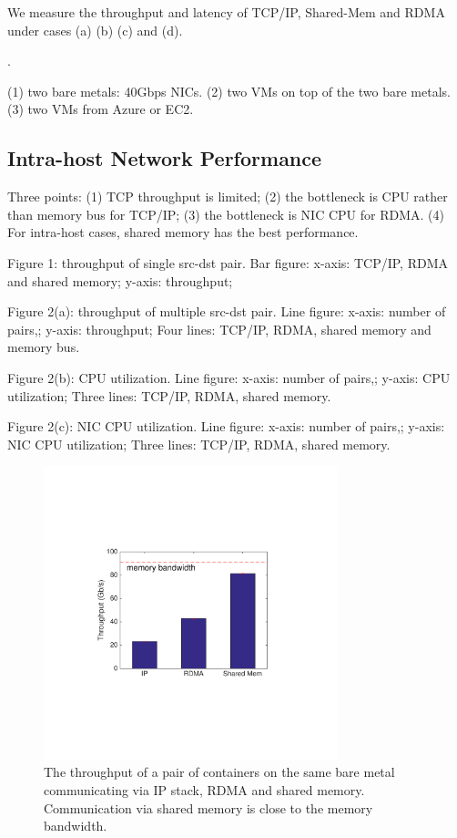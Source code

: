 We measure the throughput and latency of TCP/IP, Shared-Mem and RDMA under cases
(a) (b) (c) and (d).

.


(1) two bare metals: 40Gbps NICs.
(2) two VMs on top of the two bare metals.
(3) two VMs from Azure or EC2.

\subsection{Intra-host Network Performance}


Three points: (1) TCP throughput is limited; (2) the bottleneck is CPU rather than memory bus for TCP/IP; (3) the bottleneck is NIC CPU for RDMA. (4) For intra-host cases, shared memory has the best performance.

Figure 1: throughput of single src-dst pair. Bar figure: x-axis: TCP/IP, RDMA and shared memory; y-axis: throughput;

Figure 2(a): throughput of multiple src-dst pair. Line figure: x-axis: number of pairs,; y-axis: throughput; Four lines: TCP/IP, RDMA, shared memory and memory bus.

Figure 2(b): CPU utilization. Line figure: x-axis: number of pairs,; y-axis: CPU utilization; Three lines: TCP/IP, RDMA, shared memory.

Figure 2(c): NIC CPU utilization. Line figure: x-axis: number of pairs,; y-axis: NIC CPU utilization; Three lines: TCP/IP, RDMA, shared memory.

\begin{figure}[!ht]
     \centering 
     \includegraphics[width=3.35in]{figures/motivation/eval_baremetal_thr.pdf} 
     \caption{\label{fig:eval_baremetal_thr} The throughput of a pair of containers on the same bare metal communicating via IP stack, RDMA and shared memory. Communication via shared memory is close to the memory bandwidth.} 
\end{figure} 

